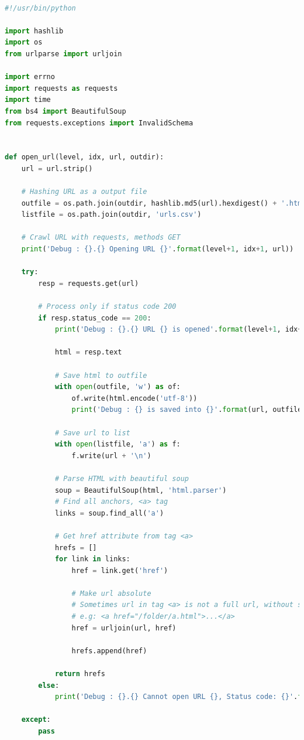 \documentclass[letterpaper,11pt]{article}
\begin{document}
\begin{lstlisting}[language=python, caption={Simple single-threaded web crawler}, label={lst:web-crawler}]

#!/usr/bin/python

import hashlib
import os
from urlparse import urljoin

import errno
import requests as requests
import time
from bs4 import BeautifulSoup
from requests.exceptions import InvalidSchema


def open_url(level, idx, url, outdir):
    url = url.strip()

    # Hashing URL as a output file
    outfile = os.path.join(outdir, hashlib.md5(url).hexdigest() + '.html')
    listfile = os.path.join(outdir, 'urls.csv')

    # Crawl URL with requests, methods GET
    print('Debug : {}.{} Opening URL {}'.format(level+1, idx+1, url))

    try:
        resp = requests.get(url)

        # Process only if status code 200
        if resp.status_code == 200:
            print('Debug : {}.{} URL {} is opened'.format(level+1, idx+1, url))

            html = resp.text

            # Save html to outfile
            with open(outfile, 'w') as of:
                of.write(html.encode('utf-8'))
                print('Debug : {} is saved into {}'.format(url, outfile))

            # Save url to list
            with open(listfile, 'a') as f:
                f.write(url + '\n')

            # Parse HTML with beautiful soup
            soup = BeautifulSoup(html, 'html.parser')
            # Find all anchors, <a> tag
            links = soup.find_all('a')

            # Get href attribute from tag <a>
            hrefs = []
            for link in links:
                href = link.get('href')

                # Make url absolute
                # Sometimes url in tag <a> is not a full url, without schema and host
                # e.g: <a href="/folder/a.html">...</a>
                href = urljoin(url, href)

                hrefs.append(href)

            return hrefs
        else:
            print('Debug : {}.{} Cannot open URL {}, Status code: {}'.format(level+1, idx+1, url,
                                                                             resp.status_code))
    except:
        pass



\end{lstlisting}
\end{document}
